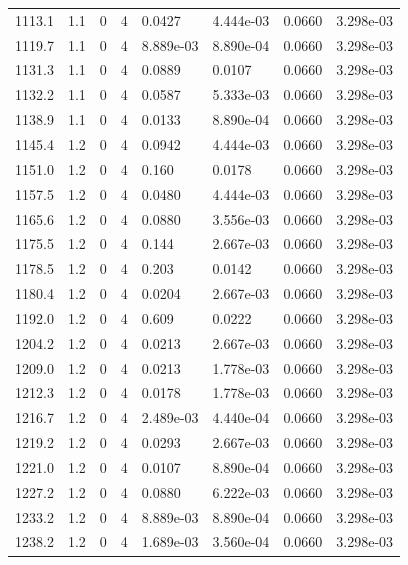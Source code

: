 \documentclass[preview]{standalone}
\begin{document}
{{{{{{{\begin{tabular}{L{1.2cm}C{1.2cm} C{0.3cm}C{0.5cm} C{1.4cm}C{1.4cm} C{1.4cm}C{1.4cm}}
  1113.1  &   1.1  & 0     &  4 &  0.0427  & 4.444e-03  & 0.0660 &  3.298e-03   \\ 
  1119.7  &   1.1  & 0     &  4 &  8.889e-03  & 8.890e-04  & 0.0660 &  3.298e-03   \\ 
  1131.3  &   1.1  & 0     &  4 &  0.0889  & 0.0107  & 0.0660 &  3.298e-03   \\ 
  1132.2  &   1.1  & 0     &  4 &  0.0587  & 5.333e-03  & 0.0660 &  3.298e-03   \\ 
  1138.9  &   1.1  & 0     &  4 &  0.0133  & 8.890e-04  & 0.0660 &  3.298e-03   \\ 
  1145.4  &   1.2  & 0     &  4 &  0.0942  & 4.444e-03  & 0.0660 &  3.298e-03   \\ 
  1151.0  &   1.2  & 0     &  4 &  0.160  & 0.0178  & 0.0660 &  3.298e-03   \\ 
  1157.5  &   1.2  & 0     &  4 &  0.0480  & 4.444e-03  & 0.0660 &  3.298e-03   \\ 
  1165.6  &   1.2  & 0     &  4 &  0.0880  & 3.556e-03  & 0.0660 &  3.298e-03   \\ 
  1175.5  &   1.2  & 0     &  4 &  0.144  & 2.667e-03  & 0.0660 &  3.298e-03   \\ 
  1178.5  &   1.2  & 0     &  4 &  0.203  & 0.0142  & 0.0660 &  3.298e-03   \\ 
  1180.4  &   1.2  & 0     &  4 &  0.0204  & 2.667e-03  & 0.0660 &  3.298e-03   \\ 
  1192.0  &   1.2  & 0     &  4 &  0.609  & 0.0222  & 0.0660 &  3.298e-03   \\ 
  1204.2  &   1.2  & 0     &  4 &  0.0213  & 2.667e-03  & 0.0660 &  3.298e-03   \\ 
  1209.0  &   1.2  & 0     &  4 &  0.0213  & 1.778e-03  & 0.0660 &  3.298e-03   \\ 
  1212.3  &   1.2  & 0     &  4 &  0.0178  & 1.778e-03  & 0.0660 &  3.298e-03   \\ 
  1216.7  &   1.2  & 0     &  4 &  2.489e-03  & 4.440e-04  & 0.0660 &  3.298e-03   \\ 
  1219.2  &   1.2  & 0     &  4 &  0.0293  & 2.667e-03  & 0.0660 &  3.298e-03   \\ 
  1221.0  &   1.2  & 0     &  4 &  0.0107  & 8.890e-04  & 0.0660 &  3.298e-03   \\ 
  1227.2  &   1.2  & 0     &  4 &  0.0880  & 6.222e-03  & 0.0660 &  3.298e-03   \\ 
  1233.2  &   1.2  & 0     &  4 &  8.889e-03  & 8.890e-04  & 0.0660 &  3.298e-03   \\ 
  1238.2  &   1.2  & 0     &  4 &  1.689e-03  & 3.560e-04  & 0.0660 &  3.298e-03   \\ 

\end{tabular}}}}}}}}
\end{document}
